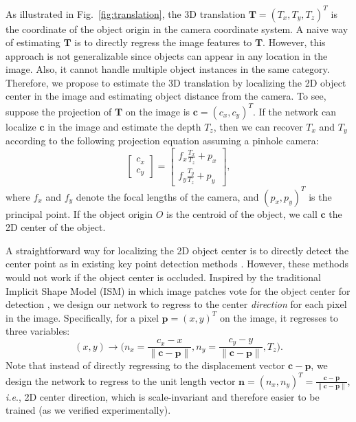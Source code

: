 \documentclass[conference]{IEEEtran}
\begin{document}

As illustrated in Fig.~\ref{fig:translation}, the 3D translation $\mathbf{T} = (T_x, T_y, T_z)^T$ is the coordinate of the object origin in the camera coordinate system. A naive way of estimating $\mathbf{T}$ is to directly regress the image features to $\mathbf{T}$. However, this approach is not generalizable since objects can appear in any location in the image. Also, it cannot handle multiple object instances in the same category. Therefore, we propose to estimate the 3D translation by localizing the 2D object center in the image and estimating object distance from the camera. To see, suppose the projection of $\mathbf{T}$ on the image is $\mathbf{c} = (c_x, c_y)^T$. If the network can localize $\mathbf{c}$ in the image and estimate the depth $T_z$, then we can recover $T_x$ and $T_y$ according to the following projection equation assuming a pinhole camera:
\begin{equation} \label{eq:projection}
\begin{bmatrix}
c_x \\[0.5em] c_y
\end{bmatrix} = \begin{bmatrix}
f_x \frac{T_x}{T_z} + p_x \\[0.5em]
f_y \frac{T_y}{T_z} + p_y
\end{bmatrix},
\end{equation}
where $f_x$ and $f_y$ denote the focal lengths of the camera, and $(p_x, p_y)^T$ is the principal point. If the object origin $O$ is the centroid of the object, we call $\mathbf{c}$ the 2D center of the object.

A straightforward way for localizing the 2D object center is to directly detect the center point as in existing key point detection methods \cite{pavlakos2017,cao2017realtime}. However, these methods would not work if the object center is occluded.  Inspired by the traditional Implicit Shape Model (ISM) in which image patches vote for the object center for detection \cite{leibe2004combined}, we design our network to regress to the center \emph{direction} for each pixel in the image. Specifically, for a pixel $\mathbf{p} = (x, y)^T$ on the image, it regresses to three variables:
\begin{equation} \label{eq::center}
(x, y) \rightarrow \Big(n_x = \frac{c_x - x}{\| \mathbf{c} - \mathbf{p} \|}, n_y = \frac{c_y - y}{\| \mathbf{c} - \mathbf{p} \|}, T_z\Big).
\end{equation}
Note that instead of directly regressing to the displacement vector $\mathbf{c} - \mathbf{p}$, we design the network to regress to the unit length vector $\mathbf{n} = (n_x, n_y)^T = \frac{\mathbf{c} - \mathbf{p}}{\| \mathbf{c} - \mathbf{p} \|}$, \emph{i.e}., 2D center direction, which is scale-invariant and therefore easier to be trained (as we verified experimentally).
\end{document}
